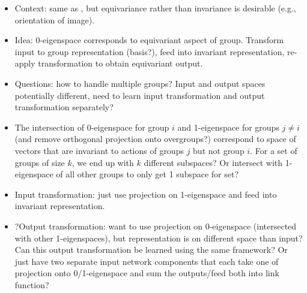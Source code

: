 \begin{itemize}

\item
Context: same as \parencite{Mouli:2021}, but equivariance rather than invariance is desirable (e.g., orientation of image).

\item
Idea: 0-eigenspace corresponds to equivariant aspect of group. Transform input to group representation (basis?), feed into invariant representation, re-apply transformation to obtain equivariant output.

\item
Questions: how to handle multiple groups? Input and output spaces potentially different, need to learn input transformation and output transformation separately?

\item
The intersection of 0-eigenspace for group $i$ and 1-eigenspace for groups $j\neq i$ (and remove orthogonal projection onto overgroups?) correspond to space of vectors that are invariant to actions of groups $j$ but not group $i$. For a set of groups of size $k$, we end up with $k$ different subspaces? Or intersect with 1-eigenspace of all other groups to only get 1 subspace for set?

\item
Input transformation: just use projection on 1-eigenspace and feed into invariant representation.

\item
?Output transformation: want to use projection on 0-eigenspace (intersected with other 1-eigenspaces), but representation is on different space than input? Can this output transformation be learned using the same framework? Or just have two separate input network components that each take one of projection onto 0/1-eigenspace and sum the outputs/feed both into link function?

\end{itemize}
\fi



